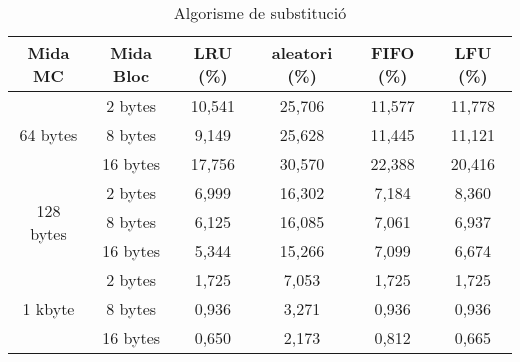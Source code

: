 \documentclass{article}
\begin{document}
\begin{table}[!h]
\begin{tabular}{|c|c|c|c|c|c|}
\hline
Mida MC & Mida Bloc & LRU (\%) & aleatori (\%) & FIFO (\%) & LFU (\%) \\
\hline
\multirow{3}{4em}{64 bytes}   & 2 bytes  & 10,541  & 25,706  & 11,577   & 11,778  \\
        & 8 bytes  & 9,149   & 25,628   & 11,445  & 11,121  \\
        & 16 bytes & 17,756  & 30,570 & 22,388  & 20,416  \\
\hline
\multirow{3}{4em}{128 bytes}  & 2 bytes  & 6,999   & 16,302   & 7,184    & 8,360   \\
        & 8 bytes  & 6,125   & 16,085   & 7,061 & 6,937   \\
        & 16 bytes & 5,344   & 15,266  & 7,099   & 6,674   \\
\hline
\multirow{3}{4em}{1 kbyte}      & 2 bytes  & 1,725   & 7,053        & 1,725    & 1,725   \\
        & 8 bytes  & 0,936   & 3,271        & 0,936    & 0,936   \\
        & 16 bytes & 0,650   & 2,173        & 0,812    & 0,665  
\\
\hline
\end{tabular}
\caption{Algorisme de substitució}
\label{tab:sub}
\end{table}
\end{document}
